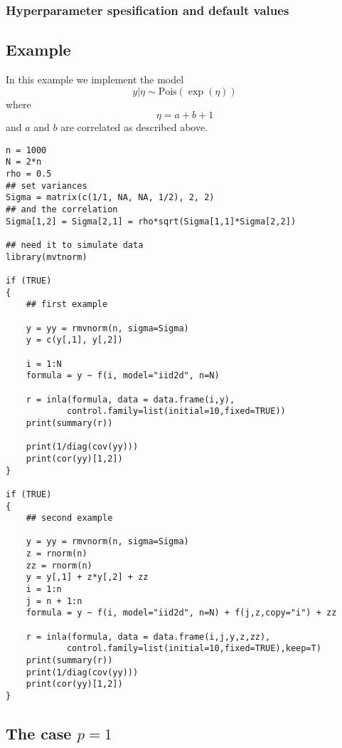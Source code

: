 \documentclass[a4paper,11pt]{article}
\begin{document}
\subsubsection*{Hyperparameter spesification and default values}



\subsection*{Example}
In this example we implement the model
\begin{displaymath}
    y|\eta\sim\mbox{Pois}(\exp(\eta))
\end{displaymath}
where
\begin{displaymath}
    \eta=a+b+1
\end{displaymath}
and $a$ and $b$ are correlated as described above.

\begin{verbatim}
n = 1000
N = 2*n
rho = 0.5
## set variances
Sigma = matrix(c(1/1, NA, NA, 1/2), 2, 2)
## and the correlation
Sigma[1,2] = Sigma[2,1] = rho*sqrt(Sigma[1,1]*Sigma[2,2])

## need it to simulate data
library(mvtnorm)

if (TRUE)
{
    ## first example
    
    y = yy = rmvnorm(n, sigma=Sigma)
    y = c(y[,1], y[,2])

    i = 1:N
    formula = y ~ f(i, model="iid2d", n=N)

    r = inla(formula, data = data.frame(i,y),
            control.family=list(initial=10,fixed=TRUE))
    print(summary(r))

    print(1/diag(cov(yy)))
    print(cor(yy)[1,2])
}

if (TRUE)
{
    ## second example

    y = yy = rmvnorm(n, sigma=Sigma)
    z = rnorm(n)
    zz = rnorm(n)
    y = y[,1] + z*y[,2] + zz
    i = 1:n
    j = n + 1:n
    formula = y ~ f(i, model="iid2d", n=N) + f(j,z,copy="i") + zz 

    r = inla(formula, data = data.frame(i,j,y,z,zz),
            control.family=list(initial=10,fixed=TRUE),keep=T)
    print(summary(r))
    print(1/diag(cov(yy)))
    print(cor(yy)[1,2])
}
\end{verbatim}

\subsection*{The case $p=1$}
\end{document}
